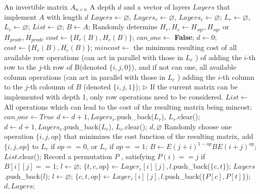 \begin{algorithm}[htbp]
\caption{Improved greedy algorithm for synthesizing low-depth CNOT circuits}
\label{alg:Shi-and-Feng-AES-24}
\footnotesize
\begin{algorithmic}[1]
\Require An invertible matrix $A_{n \times n}$
\Ensure A depth $d$ and a vector of layers $Layers$ that implement $A$ with length $d$
	\State $Layers \leftarrow \varnothing$, $Layers_{r} \leftarrow \varnothing$, $Layers_{c} \leftarrow \varnothing$;
	\State $L_{r} \leftarrow \varnothing$, $L_{c} \leftarrow \varnothing$;
	\State $List \leftarrow \varnothing$;
	\State $B \leftarrow A$;
	\State Randomly determine $H_{r}, H_{c} \leftarrow H_{sqr}, H_{sqc}$ or $H_{prodr}, H_{prodc}$
	\State $cost \leftarrow \{H_{r}(B), H_{c}(B)\}$;
	\State $can\_one \leftarrow$ \textbf{False};
	\State $d \leftarrow 0$;
		\State $cost \leftarrow\{H_{r}(B), H_{c}(B)\}$;
		\State $mincost \leftarrow$ the minimum resulting cost of all available row operations (can act in parallel with those in $L_{r}$ ) of adding the $i$-th row to the $j$-th row of B(denoted $\{i, j, 0\}$), and if not can one, all available column operations (can act in parallel with those in $L_{c}$ ) adding the $i$-th column to the $j$-th coloumn of $B$ (denoted $\{i, j, 1\}$); $\rhd$ If the current matrix can be implemented with depth 1, only row operations need to be considered.
		\State $List \leftarrow$ {All operations which can lead to the cost of the resulting matrix being mincost};
				\State $can\_one \leftarrow True$
            \EndIf
	            \State $d \leftarrow d+1, Layers_{r}$.push\_back($L_{r}$), $L_{r}$.clear();
            \EndIf
	            \State $d \leftarrow d+1, Layers_{c}$.push\_back($L_{c}$), $L_{c}$.clear();
            \EndIf
	            \Break
            \EndIf
	            \Return $d, \varnothing$
            \EndIf
        \Else
	        \State Randomly choose one operation $\{i, j, op\}$ that minimizes the cost function of the resulting matrix, add $\{i, j, op\}$ to $L_{r}$ if $op == 0$, or $L_{c}$ if $op == 1$;
	        \State $B \leftarrow E(j+i)^{1-op}BE(i+j)^{op}$;
        \EndIf
        \State $List$.clear();
    \EndWhile
    \State Record a permutation $P$ , satisfying $P(i) == j$ if $B[i][j] == 1$;
	    \State $l \leftarrow \varnothing$;
		    \State $\{t, c, op\} \leftarrow Layer_{c}[i][j], l$.push\_back($\{c, t\}$);
        \EndFor
        \State $Layers$.push\_back($l$);
    \EndFor
	    \State $l \leftarrow \varnothing$;
		    \State $\{c, t, op\} \leftarrow Layer_{c}[i][j], l$.push\_back($\{P[c], P[t]\}$);
        \EndFor
    \EndFor
\State  \Return $d, Layers$;
\end{algorithmic}
\end{algorithm}

